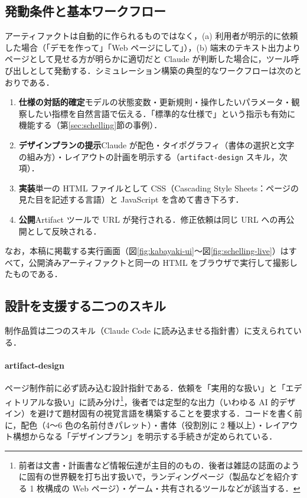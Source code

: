 \documentclass[a4paper]{jlreq}
\begin{document}
\subsection{発動条件と基本ワークフロー}

アーティファクトは自動的に作られるものではなく，(a) 利用者が明示的に依頼した場合（「デモを作って」「Web ページにして」），(b) 端末のテキスト出力よりページとして見せる方が明らかに適切だと Claude が判断した場合に，ツール呼び出しとして発動する．シミュレーション構築の典型的なワークフローは次のとおりである．

\begin{enumerate}
  \item \textbf{仕様の対話的確定}\quad モデルの状態変数・更新規則・操作したいパラメータ・観察したい指標を自然言語で伝える．「標準的な仕様で」という指示も有効に機能する（第\ref{sec:schelling}節の事例）．
  \item \textbf{デザインプランの提示}\quad Claude が配色・タイポグラフィ（書体の選択と文字の組み方）・レイアウトの計画を明示する（\texttt{artifact-design} スキル，次項）．
  \item \textbf{実装}\quad 単一の HTML ファイルとして CSS（Cascading Style Sheets：ページの見た目を記述する言語）と JavaScript を含めて書き下ろす．
  \item \textbf{公開}\quad Artifact ツールで URL が発行される．修正依頼は同じ URL への再公開として反映される．
\end{enumerate}

なお，本稿に掲載する実行画面（図\ref{fig:kabayaki-ui}〜図\ref{fig:schelling-live}）はすべて，公開済みアーティファクトと同一の HTML をブラウザで実行して撮影したものである．

\subsection{設計を支援する二つのスキル}

制作品質は二つのスキル（Claude Code に読み込ませる指針書）に支えられている．

\paragraph{artifact-design}
ページ制作前に必ず読み込む設計指針である．依頼を「実用的な扱い」と「エディトリアルな扱い」に読み分け\footnote{前者は文書・計画書など情報伝達が主目的のもの．後者は雑誌の誌面のように固有の世界観を打ち出す扱いで，ランディングページ（製品などを紹介する 1 枚構成の Web ページ）・ゲーム・共有されるツールなどが該当する．}，後者では定型的な出力（いわゆる AI 的デザイン）を避けて題材固有の視覚言語を構築することを要求する．コードを書く前に，配色（4〜6 色の名前付きパレット）・書体（役割別に 2 種以上）・レイアウト構想からなる「デザインプラン」を明示する手続きが定められている．
\end{document}
